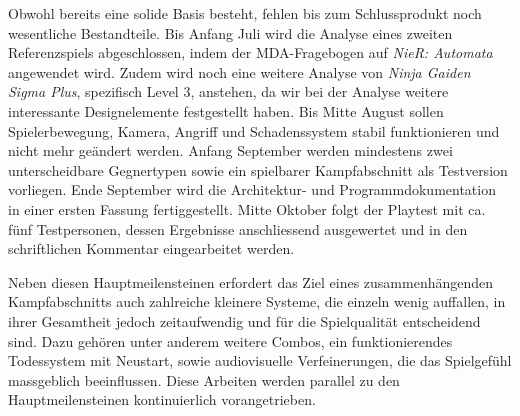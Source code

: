 \documentclass[../Main.tex]{subfiles}
\begin{document}
Obwohl bereits eine solide Basis besteht, fehlen bis zum Schlussprodukt noch wesentliche Bestandteile. Bis Anfang Juli wird die Analyse eines zweiten Referenzspiels abgeschlossen, indem der MDA-Fragebogen auf \textit{NieR: Automata} angewendet wird. Zudem wird noch eine weitere Analyse von \textit{Ninja Gaiden Sigma Plus}, spezifisch Level 3, anstehen, da wir bei der Analyse weitere interessante Designelemente festgestellt haben. Bis Mitte August sollen Spielerbewegung, Kamera, Angriff und Schadenssystem stabil funktionieren und nicht mehr geändert werden. Anfang September werden mindestens zwei unterscheidbare Gegnertypen sowie ein spielbarer Kampfabschnitt als Testversion vorliegen. Ende September wird die Architektur- und Programmdokumentation in einer ersten Fassung fertiggestellt. Mitte Oktober folgt der Playtest mit ca. fünf Testpersonen, dessen Ergebnisse anschliessend ausgewertet und in den schriftlichen Kommentar eingearbeitet werden.

Neben diesen Hauptmeilensteinen erfordert das Ziel eines zusammenhängenden Kampfabschnitts auch zahlreiche kleinere Systeme, die einzeln wenig auffallen, in ihrer Gesamtheit jedoch zeitaufwendig und für die Spielqualität entscheidend sind. Dazu gehören unter anderem weitere Combos, ein funktionierendes Todessystem mit Neustart, sowie audiovisuelle Verfeinerungen, die das Spielgefühl massgeblich beeinflussen. Diese Arbeiten werden parallel zu den Hauptmeilensteinen kontinuierlich vorangetrieben.
\end{document}
